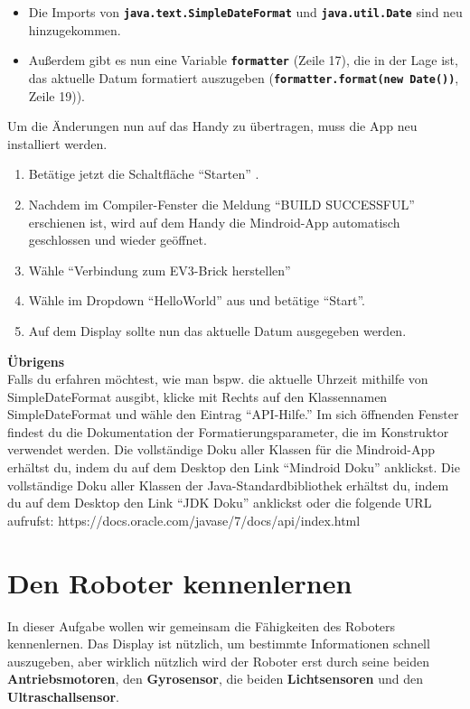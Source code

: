 \documentclass[
	12pt,
	article,
	type=bsc, %
	colorbacktitle,
	instlogo,
	accentcolor=tud1c,
	german,
	twoside
]{tudexercise}
\newcommand{\solpath}[0]{../../impl/androidApp/app/src/main/java/org/mindroid/android/app/programs/workshop/solutions}
\newcommand{\bfcode}[1]{\texttt{\textbf{#1}}}
\begin{document}
		
		\begin{itemize}
		\item Die Imports von \bfcode{java.text.SimpleDateFormat} und \bfcode{java.util.Date} sind neu hinzugekommen.
		\item Außerdem gibt es nun eine Variable \bfcode{formatter} (Zeile 17), die in der Lage ist, das aktuelle Datum formatiert auszugeben (\bfcode{formatter.format(new Date())}, Zeile 19)).
		\end{itemize}
		Um die Änderungen nun auf das Handy zu übertragen, muss die App neu installiert werden.
		\begin{enumerate}
		\item Betätige jetzt die Schaltfläche “Starten” .
		\item Nachdem im Compiler-Fenster die Meldung “BUILD SUCCESSFUL” erschienen ist, wird auf dem Handy die Mindroid-App automatisch geschlossen und wieder geöffnet.
		\item Wähle “Verbindung zum EV3-Brick herstellen”
		\item Wähle im Dropdown “HelloWorld” aus und betätige “Start”.
		\item Auf dem Display sollte nun das aktuelle Datum ausgegeben werden.
		
		\end{enumerate}
		
	\textbf{Übrigens}\\
		
	Falls du erfahren möchtest, wie man bspw. die aktuelle Uhrzeit mithilfe von SimpleDateFormat ausgibt, klicke mit Rechts auf den Klassennamen SimpleDateFormat und wähle den Eintrag “API-Hilfe.” Im sich öffnenden Fenster findest du die Dokumentation der Formatierungsparameter, die im Konstruktor verwendet werden.
	Die vollständige Doku aller Klassen für die Mindroid-App erhältst du, indem du auf dem Desktop den Link “Mindroid Doku” anklickst.
	Die vollständige Doku aller Klassen der Java-Standardbibliothek erhältst du, indem du auf dem Desktop den Link “JDK Doku” anklickst oder die folgende URL aufrufst: https://docs.oracle.com/javase/7/docs/api/index.html 
	
	
	\section{Den Roboter kennenlernen}
	In dieser Aufgabe wollen wir gemeinsam die Fähigkeiten des Roboters kennenlernen. Das Display ist nützlich, um bestimmte Informationen schnell auszugeben, aber wirklich nützlich wird der Roboter erst durch seine beiden \textbf{Antriebsmotoren}, den \textbf{Gyrosensor}, die beiden \textbf{Lichtsensoren} und den \textbf{Ultraschallsensor}.
	
\end{document}
